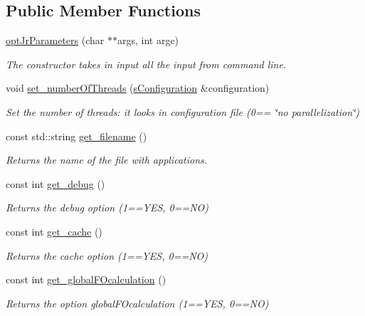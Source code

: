 \subsection*{Public Member Functions}
\begin{DoxyCompactItemize}
\item 
\hyperlink{classoptJrParameters_a76f806d48141b4b4c7a215c2645011de}{opt\-Jr\-Parameters} (char $\ast$$\ast$args, int argc)
\begin{DoxyCompactList}\small\item\em The constructor takes in input all the input from command line. \end{DoxyCompactList}\item 
void \hyperlink{classoptJrParameters_a3747d78e5dd35b8b1aa1c037e9d91cf7}{set\-\_\-number\-Of\-Threads} (\hyperlink{readConfigurationFile_8hh_ab8f35b1da3261263c5e9c0e7c8921f5c}{s\-Configuration} \&configuration)
\begin{DoxyCompactList}\small\item\em Set the number of threads\-: it looks in configuration file (0== \char`\"{}no parallelization\char`\"{}) \end{DoxyCompactList}\item 
const std\-::string \hyperlink{classoptJrParameters_a8dcc738e721b3df88c2622712ed83414}{get\-\_\-filename} ()
\begin{DoxyCompactList}\small\item\em Returns the name of the file with applications. \end{DoxyCompactList}\item 
const int \hyperlink{classoptJrParameters_a64016f274261a7a7d74d8460bb7e2ee4}{get\-\_\-debug} ()
\begin{DoxyCompactList}\small\item\em Returns the debug option (1==Y\-E\-S, 0==N\-O) \end{DoxyCompactList}\item 
const int \hyperlink{classoptJrParameters_ac698812fa1177c71eb46dc61d2e5af77}{get\-\_\-cache} ()
\begin{DoxyCompactList}\small\item\em Returns the cache option (1==Y\-E\-S, 0==N\-O) \end{DoxyCompactList}\item 
const int \hyperlink{classoptJrParameters_a7eec5151603fd03276b6fcf6213f9f90}{get\-\_\-global\-F\-Ocalculation} ()
\begin{DoxyCompactList}\small\item\em Returns the option global\-F\-Ocalculation (1==Y\-E\-S, 0==N\-O) \end{DoxyCompactList}\item 
$$
\end{DoxyCompactItemize}
